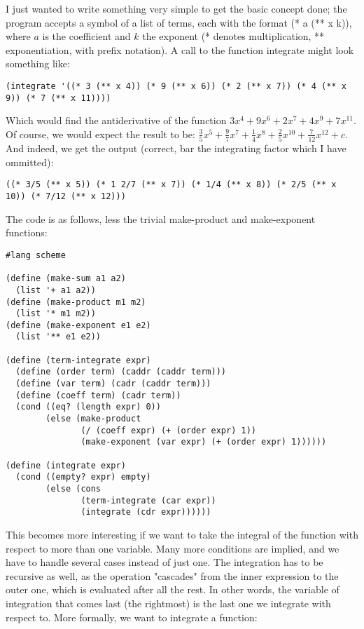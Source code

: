 \documentclass{article}
\begin{document}
I just wanted to write something very simple to get the basic concept done; the program accepts a symbol of a list of terms, each with the format (* a (** x k)), where \(a\) is the coefficient and \(k\) the exponent (* denotes multiplication, ** exponentiation, with prefix notation). A call to the function integrate might look something like:
\begin{lstlisting}
(integrate '((* 3 (** x 4)) (* 9 (** x 6)) (* 2 (** x 7)) (* 4 (** x 9)) (* 7 (** x 11))))
\end{lstlisting}
Which would find the antiderivative of the function \(3x^{4} + 9x^{6} + 2x^{7} + 4x^{9} + 7x^{11}\). Of course, we would expect the result to be: \(\frac{3}{5}x^{5} + \frac{9}{7}x^{7} + \frac{1}{4}x^{8} + \frac{2}{5}x^{10} + \frac{7}{12}x^{12} + c\). And indeed, we get the output (correct, bar the integrating factor which I have ommitted):
\begin{lstlisting}
((* 3/5 (** x 5)) (* 1 2/7 (** x 7)) (* 1/4 (** x 8)) (* 2/5 (** x 10)) (* 7/12 (** x 12)))
\end{lstlisting}
The code is as follows, less the trivial make-product and make-exponent functions:
\begin{lstlisting}
#lang scheme
 
(define (make-sum a1 a2) 
  (list '+ a1 a2))
(define (make-product m1 m2) 
  (list '* m1 m2))
(define (make-exponent e1 e2)
  (list '** e1 e2))
 
(define (term-integrate expr)
  (define (order term) (caddr (caddr term)))
  (define (var term) (cadr (caddr term)))
  (define (coeff term) (cadr term))
  (cond ((eq? (length expr) 0))
        (else (make-product 
               (/ (coeff expr) (+ (order expr) 1)) 
               (make-exponent (var expr) (+ (order expr) 1))))))
 
(define (integrate expr)
  (cond ((empty? expr) empty)
        (else (cons 
               (term-integrate (car expr))
               (integrate (cdr expr))))))
\end{lstlisting}

This becomes more interesting if we want to take the integral of the function with respect to more than one variable. Many more conditions are implied, and we have to handle several cases instead of just one. The integration has to be recursive as well, as the operation "cascades" from the inner expression to the outer one, which is evaluated after all the rest. In other words, the variable of integration that comes last (the rightmost) is the last one we integrate with respect to. More formally, we want to integrate a function:
\end{document}

